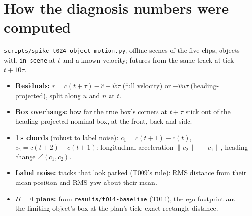 \documentclass[11pt]{article}
\theoremstyle{definition}
\theoremstyle{remark}
\begin{document}
\appendix
\section{How the diagnosis numbers were computed}\label{app:data}
\texttt{scripts/spike\_t024\_object\_motion.py}, offline scenes of the five clips, objects with
\texttt{in\_scene} at $t$ and a known velocity; futures from the same track at tick $t+10\tau$.
\begin{itemize}[leftmargin=*]
  \item \textbf{Residuals:} $r=c(t+\tau)-\hat c-\hat w\tau$ (full velocity) or $-\hat v u\tau$
    (heading-projected), split along $u$ and $n$ at $t$.
  \item \textbf{Box overhangs:} how far the true box's corners at $t+\tau$ stick out of the
    heading-projected nominal box, at the front, back and side.
  \item \textbf{1\,s chords} (robust to label noise): $c_1=c(t+1)-c(t)$, $c_2=c(t+2)-c(t+1)$; longitudinal
    acceleration $\|c_2\|-\|c_1\|$, heading change $\angle(c_1,c_2)$.
  \item \textbf{Label noise:} tracks that look parked (T009's rule): RMS distance from their mean position
    and RMS yaw about their mean.
  \item \textbf{$H=0$ plans:} from \texttt{results/t014-baseline} (T014), the ego footprint and the
    limiting object's box at the plan's tick; exact rectangle distance.
\end{itemize}
\end{document}
